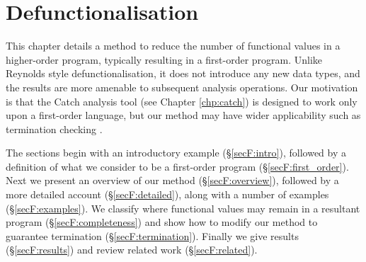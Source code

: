 


\begin{comment}
\begin{code}
import Prelude hiding (map)
import Data.List hiding (map)

data Expr = EVar String
          | ECon String [Expr]
          | EFun String [Expr]
          | EApp Expr [Expr]
          | ELam String Expr
          | ELet String Expr Expr
          | ECase Expr [Alt]
data Alt = EAlt String [String] Expr

instance Eq Expr

type FuncName = String
body   :: FuncName  -> Expr
rhs    :: Alt       -> Expr

data World = World
expensive :: a -> b
primEqInt, primNeqInt :: Int -> Int -> Bool
primCatch :: alpha -> (IOError -> alpha) -> alpha
apply :: a
ellipses :: a

type VarName   = String
freeVars :: Expr -> [VarName]
universe :: Expr -> [Expr]
transform :: (Expr -> Expr) -> Expr -> Expr
\end{code}
\end{comment}



\chapter{Defunctionalisation}
\label{chp:firstify}

This chapter details a method to reduce the number of functional values in a higher-order program, typically resulting in a first-order program. Unlike Reynolds style defunctionalisation, it does not introduce any new data types, and the results are more amenable to subsequent analysis operations. Our motivation is that the Catch analysis tool (see Chapter \ref{chp:catch}) is designed to work only upon a first-order language, but our method may have wider applicability such as termination checking \cite{sereni:higher_order_termination}.

The sections begin with an introductory example (\S\ref{secF:intro}), followed by a definition of what we consider to be a first-order program (\S\ref{secF:first_order}). Next we present an overview of our method (\S\ref{secF:overview}), followed by a more detailed account (\S\ref{secF:detailed}), along with a number of examples (\S\ref{secF:examples}). We classify where functional values may remain in a resultant program (\S\ref{secF:completeness}) and show how to modify our method to guarantee termination (\S\ref{secF:termination}). Finally we give results (\S\ref{secF:results}) and review related work (\S\ref{secF:related}).

